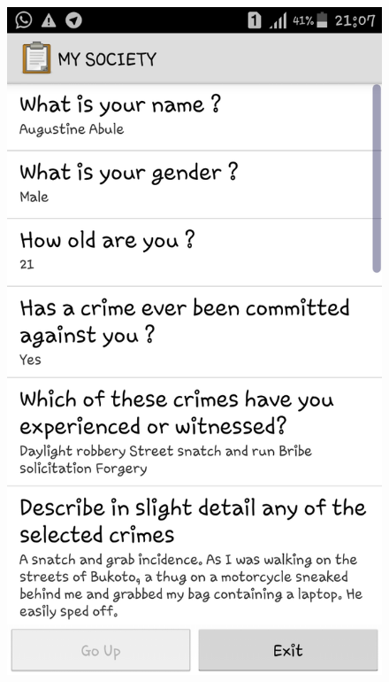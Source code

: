 \documentclass{article}
\begin{document}
\begin{figure}[h!]
\centering
\includegraphics[width=1\textwidth]{Screenshot 1.png}
\end{figure}
\end{document}

